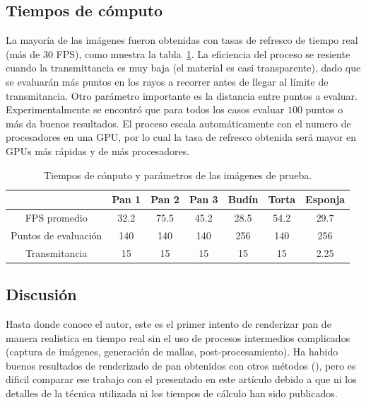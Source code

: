 \documentclass[oneside,a4paper,spanish,links]{amca}
\begin{document}
\subsection{Tiempos de cómputo}

La mayoría de las imágenes fueron obtenidas con tasas de refresco de
tiempo real (más de 30 FPS), como muestra la tabla~\ref{tab:n1}. La
eficiencia del proceso se resiente cuando la transmittancia es muy
baja (el material es casi transparente), dado que se evaluarán más
puntos en los rayos a recorrer antes de llegar al límite de
transmitancia. Otro parámetro importante es la distancia entre puntos
a evaluar. Experimentalmente se encontró que para todos los casos
evaluar $100$ puntos o más da buenos resultados. El proceso escala
automáticamente con el numero de procesadores en una GPU, por lo cual
la tasa de refresco obtenida será mayor en GPUs más rápidas y de más
procesadores.

\begin{table}[htb]
\centering
\begin{tabular}{|c|c|c|c|c|c|c|}
\hline &  Pan 1 & Pan 2 & Pan 3 & Budín & Torta & Esponja \\
\hline
\hline
 FPS promedio  & 32.2 &  75.5 &  45.2 & 28.5 &  54.2 & 29.7\\
\hline
 Puntos de evaluación &  140 &  140 &  140 & 256 &  140 & 256 \\
\hline
 Transmitancia &  15 &  15 &  15 & 15 &  15 & 2.25 \\
\hline
\end{tabular}
\caption{Tiempos de cónputo y parámetros de las imágenes de prueba.}
\label{tab:n1}
\end{table}

\subsection{Discusi\'on}

Hasta donde conoce el autor, este es el primer intento de renderizar
pan de manera realistica en tiempo real sin el uso de procesos
intermedios complicados (captura de imágenes, generación de mallas,
post-procesamiento). Ha habido buenos resultados de renderizado de pan
obtenidos con otros métodos (\citep{Cho2007}), pero es dificil
comparar ese trabajo con el presentado en este artículo debido a que
ni los detalles de la técnica utilizada ni los tiempos de cálculo han
sido publicados.
\end{document}
